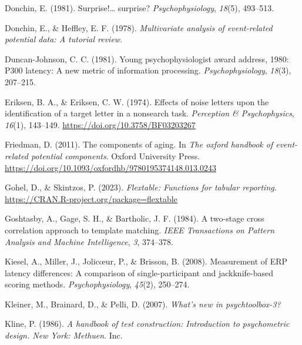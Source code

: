 \documentclass[
  man]{apa7}
\newlength{\cslhangindent}
\newlength{\cslentryspacingunit} %
\newenvironment{CSLReferences}[2] %
 {%
  \setlength{\parindent}{0pt}
  \ifodd #1
  \let\oldpar\par
  \def\par{\hangindent=\cslhangindent\oldpar}
  \fi
  \setlength{\parskip}{#2\cslentryspacingunit}
 }%
 {}
\begin{document}
\begin{CSLReferences}{1}{0}
\leavevmode{}%
Donchin, E. (1981). Surprise!\ldots{} surprise? \emph{Psychophysiology}, \emph{18}(5), 493--513.

\leavevmode{}%
Donchin, E., \& Heffley, E. F. (1978). \emph{Multivariate analysis of event-related potential data: {A} tutorial review}.

\leavevmode{}%
Duncan-Johnson, C. C. (1981). Young psychophysiologist award address, 1980: {P300} latency: A new metric of information processing. \emph{Psychophysiology}, \emph{18}(3), 207--215.

\leavevmode{}%
Eriksen, B. A., \& Eriksen, C. W. (1974). Effects of noise letters upon the identification of a target letter in a nonsearch task. \emph{Perception \& Psychophysics}, \emph{16}(1), 143--149. \url{https://doi.org/10.3758/BF03203267}

\leavevmode{}%
Friedman, D. (2011). The components of aging. In \emph{The oxford handbook of event-related potential components}. Oxford University Press. \url{https://doi.org/10.1093/oxfordhb/9780195374148.013.0243}

\leavevmode{}%
Gohel, D., \& Skintzos, P. (2023). \emph{Flextable: Functions for tabular reporting}. \url{https://CRAN.R-project.org/package=flextable}

\leavevmode{}%
Goshtasby, A., Gage, S. H., \& Bartholic, J. F. (1984). A two-stage cross correlation approach to template matching. \emph{IEEE Transactions on Pattern Analysis and Machine Intelligence}, \emph{3}, 374--378.

\leavevmode{}%
Kiesel, A., Miller, J., Jolicœur, P., \& Brisson, B. (2008). Measurement of {ERP} latency differences: {A} comparison of single-participant and jackknife-based scoring methods. \emph{Psychophysiology}, \emph{45}(2), 250--274.

\leavevmode{}%
Kleiner, M., Brainard, D., \& Pelli, D. (2007). \emph{What's new in psychtoolbox-3?}

\leavevmode{}%
Kline, P. (1986). \emph{A handbook of test construction: {Introduction} to psychometric design. {New} {York}: {Methuen}}. Inc.


\end{CSLReferences}
\end{document}
